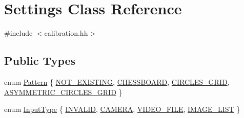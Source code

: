 \hypertarget{class_settings}{}\section{Settings Class Reference}
\label{class_settings}


{\ttfamily \#include $<$calibration.\+hh$>$}

\subsection*{Public Types}
\begin{DoxyCompactItemize}
\item 
enum \mbox{\hyperlink{class_settings_a0e7117abd9427a6f8bc1d1d8d456b5c8}{Pattern}} \{ \mbox{\hyperlink{class_settings_a0e7117abd9427a6f8bc1d1d8d456b5c8ad2f421ce100bd7e0302b17bda1a74eb9}{N\+O\+T\+\_\+\+E\+X\+I\+S\+T\+I\+NG}}, 
\mbox{\hyperlink{class_settings_a0e7117abd9427a6f8bc1d1d8d456b5c8ae96aa2d60b4a554a215524a05b32908e}{C\+H\+E\+S\+S\+B\+O\+A\+RD}}, 
\mbox{\hyperlink{class_settings_a0e7117abd9427a6f8bc1d1d8d456b5c8a79472d1c69f8ed7aa1b55f908b136f68}{C\+I\+R\+C\+L\+E\+S\+\_\+\+G\+R\+ID}}, 
\mbox{\hyperlink{class_settings_a0e7117abd9427a6f8bc1d1d8d456b5c8a2cea29ee5896f2cb4cc64df25fd2375b}{A\+S\+Y\+M\+M\+E\+T\+R\+I\+C\+\_\+\+C\+I\+R\+C\+L\+E\+S\+\_\+\+G\+R\+ID}}
 \}
\item 
enum \mbox{\hyperlink{class_settings_a5afe85d24b071973a7f248c05386f7f4}{Input\+Type}} \{ \mbox{\hyperlink{class_settings_a5afe85d24b071973a7f248c05386f7f4adb44130895aedc32a119565eb6d61bed}{I\+N\+V\+A\+L\+ID}}, 
\mbox{\hyperlink{class_settings_a5afe85d24b071973a7f248c05386f7f4aba4cc7726878c8913831f0ea6360fa05}{C\+A\+M\+E\+RA}}, 
\mbox{\hyperlink{class_settings_a5afe85d24b071973a7f248c05386f7f4ac9fd97535bc651249f9eed1fddf2d36b}{V\+I\+D\+E\+O\+\_\+\+F\+I\+LE}}, 
\mbox{\hyperlink{class_settings_a5afe85d24b071973a7f248c05386f7f4a292bd2e5ba912a92ace1606e366edc4d}{I\+M\+A\+G\+E\+\_\+\+L\+I\+ST}}
 \}
\end{DoxyCompactItemize}
